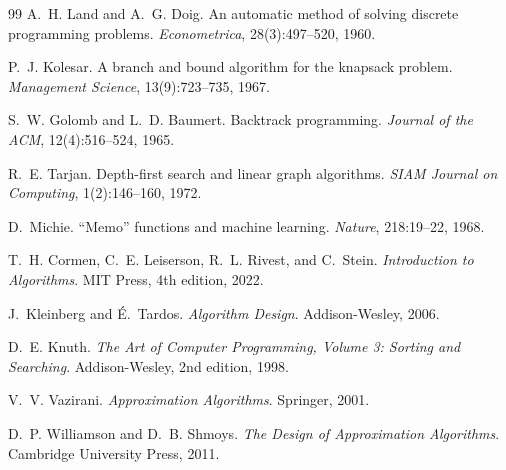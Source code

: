 \begin{thebibliography}{99}
 A.~H. Land and A.~G. Doig. An automatic method of solving discrete programming problems. \emph{Econometrica}, 28(3):497--520, 1960.

 P.~J. Kolesar. A branch and bound algorithm for the knapsack problem. \emph{Management Science}, 13(9):723--735, 1967.

 S.~W. Golomb and L.~D. Baumert. Backtrack programming. \emph{Journal of the ACM}, 12(4):516--524, 1965.

 R.~E. Tarjan. Depth-first search and linear graph algorithms. \emph{SIAM Journal on Computing}, 1(2):146--160, 1972.

 D.~Michie. ``Memo'' functions and machine learning. \emph{Nature}, 218:19--22, 1968.

 T.~H. Cormen, C.~E. Leiserson, R.~L. Rivest, and C.~Stein. \emph{Introduction to Algorithms}. MIT Press, 4th edition, 2022.

 J.~Kleinberg and \'E.~Tardos. \emph{Algorithm Design}. Addison-Wesley, 2006.

 D.~E. Knuth. \emph{The Art of Computer Programming, Volume 3: Sorting and Searching}. Addison-Wesley, 2nd edition, 1998.

 V.~V. Vazirani. \emph{Approximation Algorithms}. Springer, 2001.

 D.~P. Williamson and D.~B. Shmoys. \emph{The Design of Approximation Algorithms}. Cambridge University Press, 2011.

\end{thebibliography}
